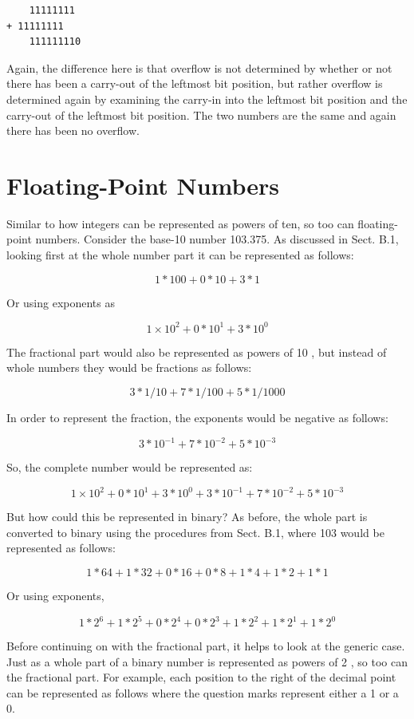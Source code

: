 \documentclass[10pt]{book}
\begin{document}
\begin{verbatim}
    11111111
+ 11111111
    111111110
\end{verbatim}

Again, the difference here is that overflow is not determined by whether or not there has been a carry-out of the leftmost bit position, but rather overflow is determined again by examining the carry-in into the leftmost bit position and the carry-out of the leftmost bit position. The two numbers are the same and again there has been no overflow.

\section{Floating-Point Numbers}
Similar to how integers can be represented as powers of ten, so too can floating-point numbers. Consider the base-10 number 103.375. As discussed in Sect. B.1, looking first at the whole number part it can be represented as follows:

$$
1 * 100+0 * 10+3 * 1
$$

Or using exponents as

$$
1 \times 10^{2}+0 * 10^{1}+3 * 10^{0}
$$

The fractional part would also be represented as powers of 10 , but instead of whole numbers they would be fractions as follows:

$$
3 * 1 / 10+7 * 1 / 100+5 * 1 / 1000
$$

In order to represent the fraction, the exponents would be negative as follows:

$$
3 * 10^{-1}+7 * 10^{-2}+5 * 10^{-3}
$$

So, the complete number would be represented as:

$$
1 \times 10^{2}+0 * 10^{1}+3 * 10^{0}+3 * 10^{-1}+7 * 10^{-2}+5 * 10^{-3}
$$

But how could this be represented in binary? As before, the whole part is converted to binary using the procedures from Sect. B.1, where 103 would be represented as follows:

$$
1 * 64+1 * 32+0 * 16+0 * 8+1 * 4+1 * 2+1 * 1
$$

Or using exponents,

$$
1 * 2^{6}+1 * 2^{5}+0 * 2^{4}+0 * 2^{3}+1 * 2^{2}+1 * 2^{1}+1 * 2^{0}
$$

Before continuing on with the fractional part, it helps to look at the generic case. Just as a whole part of a binary number is represented as powers of 2 , so too can the fractional part. For example, each position to the right of the decimal point can be represented as follows where the question marks represent either a 1 or a 0.
\end{document}
